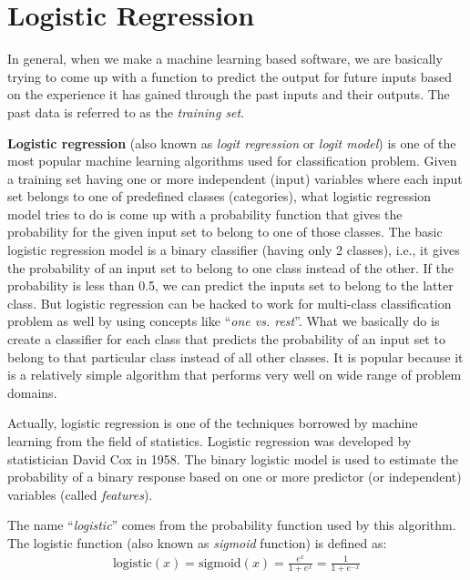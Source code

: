 
\newpage
\section{Logistic Regression}

In general, when we make a machine learning based software, we are basically
trying to come up with a function to predict the output for future inputs based
on the experience it has gained through the past inputs and their outputs.
The past data is referred to as the {\em training set}.

{\bf Logistic regression} (also known as {\em logit regression} or {\em logit model}) is one of
the most popular machine learning algorithms used for classification problem.
Given a training set having one or more independent (input) variables where
each input set belongs to one of predefined classes (categories), what
logistic regression model tries to do is come up with a probability function
that gives the probability for the given input set to belong to one of those
classes. The basic logistic regression model is a binary classifier (having
only 2 classes), i.e., it gives the probability of an input set to belong to
one class instead of the other. If the probability is less than 0.5, we can
predict the inputs set to belong to the latter class. But logistic regression
can be hacked to work for multi-class classification problem as well by using
concepts like ``{\em one vs. rest}''. What we basically do is create a classifier for
each class that predicts the probability of an input set to belong to that
particular class instead of all other classes. It is popular because it is a
relatively simple algorithm that performs very well on wide range of problem
domains.

Actually, logistic regression is one of the techniques borrowed by machine
learning from the field of statistics. Logistic regression was developed by
statistician David Cox in 1958. The binary logistic model is used to estimate
the probability of a binary response based on one or more predictor
(or independent) variables (called {\em features}).

The name ``{\em logistic}'' comes from the probability function used by this algorithm.
The logistic function (also known as {\em sigmoid} function) is defined as:
\begin{align}
  \text{logistic}(x) = \text{sigmoid}(x)
  = \frac{e^x}{1 + e^x}
  = \frac{1}{1 + e^{-x}} \label{eqn:logit}
\end{align}

